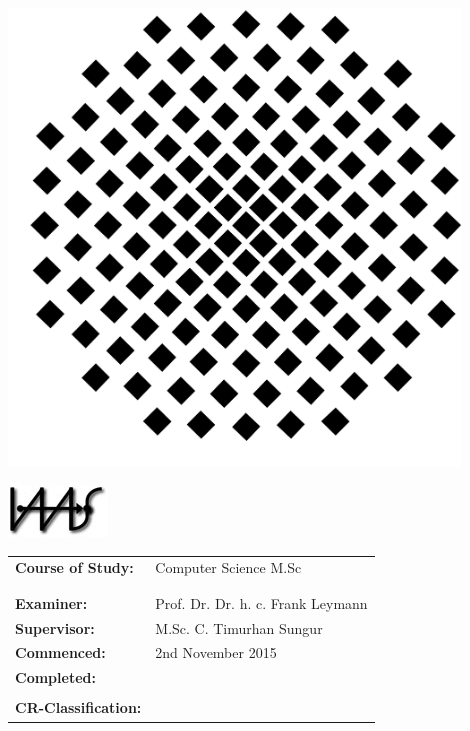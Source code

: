 \documentclass[
               fontsize=12pt, %
               paper=a4,
               twoside, %
               BCOR=3mm, %
               DIV=13,   %
               headinclude=true,
               footinclude=false,
               bibliography=totoc,
               headsepline,
               cleardoublepage=empty,
               parskip=half,
               pointlessnumbers, %
               final   %
               ]{scrbook}
\begin{document}
\begin{titlepage}
\begin{sffamily}
		\begin{center}
			\begin{minipage}{3cm}
				\begin{center}
					\includegraphics[width=0.9\textwidth]{./gfx/unilogo.pdf}
				\end{center}
			\end{minipage}
			\begin{minipage}{3cm}
				\begin{center}
					\includegraphics{./gfx/iaas.jpg}
				\end{center}
			\end{minipage}
		\end{center}
		\vspace{1.0cm}
		\begin{center}
			\begin{tabular}{ll}
				\textbf{Course of Study:} & Computer Science M.Sc\\
				&\\&\\
				\textbf{Examiner:}   & Prof. Dr. Dr. h. c. Frank Leymann\\
				\textbf{Supervisor:}   & M.Sc. C. Timurhan Sungur\\
				
				\textbf{Commenced:} & 2nd November 2015\\
				\textbf{Completed:}  & \\
				&\\
				\textbf{CR-Classification:} & \\
				
			\end{tabular}
		\end{center}
	\end{sffamily}
\end{titlepage}
\end{document}
